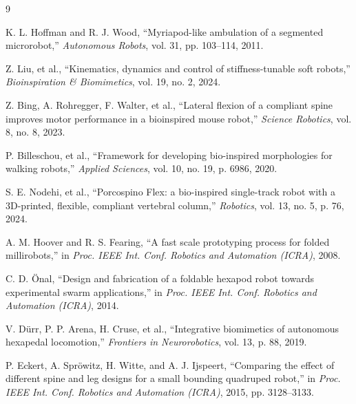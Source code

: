 \documentclass[11pt, a4paper]{article}
\begin{document}
\begin{thebibliography}{9}

K. L. Hoffman and R. J. Wood, 
``Myriapod-like ambulation of a segmented microrobot,'' 
\textit{Autonomous Robots}, vol. 31, pp. 103--114, 2011.

Z. Liu, et al., 
``Kinematics, dynamics and control of stiffness-tunable soft robots,'' 
\textit{Bioinspiration \& Biomimetics}, vol. 19, no. 2, 2024.

Z. Bing, A. Rohregger, F. Walter, et al., 
``Lateral flexion of a compliant spine improves motor performance in a bioinspired mouse robot,'' 
\textit{Science Robotics}, vol. 8, no. 8, 2023.

P. Billeschou, et al., 
``Framework for developing bio-inspired morphologies for walking robots,'' 
\textit{Applied Sciences}, vol. 10, no. 19, p. 6986, 2020.

S. E. Nodehi, et al., 
``Porcospino Flex: a bio-inspired single-track robot with a 3D-printed, flexible, compliant vertebral column,'' 
\textit{Robotics}, vol. 13, no. 5, p. 76, 2024.

A. M. Hoover and R. S. Fearing, 
``A fast scale prototyping process for folded millirobots,'' 
in \textit{Proc. IEEE Int. Conf. Robotics and Automation (ICRA)}, 2008.

C. D. \"{O}nal, 
``Design and fabrication of a foldable hexapod robot towards experimental swarm applications,'' 
in \textit{Proc. IEEE Int. Conf. Robotics and Automation (ICRA)}, 2014.

V. D\"urr, P. P. Arena, H. Cruse, et al., 
``Integrative biomimetics of autonomous hexapedal locomotion,'' 
\textit{Frontiers in Neurorobotics}, vol. 13, p. 88, 2019.

P. Eckert, A. Spr\"owitz, H. Witte, and A. J. Ijspeert, 
``Comparing the effect of different spine and leg designs for a small bounding quadruped robot,'' 
in \textit{Proc. IEEE Int. Conf. Robotics and Automation (ICRA)}, 2015, pp. 3128--3133.

\end{thebibliography}
\end{document}
